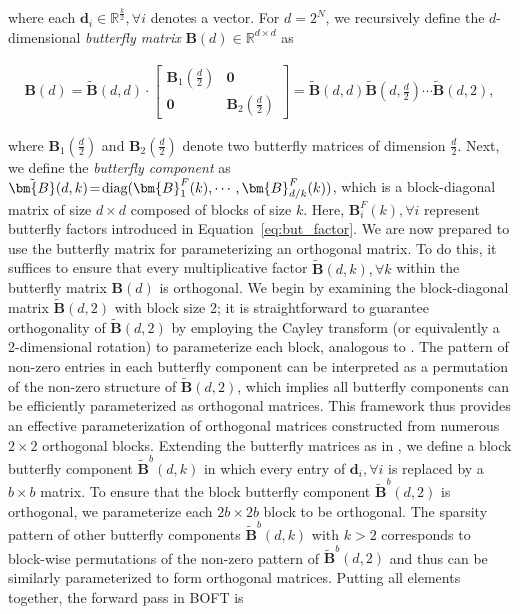 where each $\bm{d}_i\in\mathbb{R}^{\frac{k}{2}}, \forall i$ denotes a vector. For $d=2^N$, we recursively define the $d$-dimensional \emph{butterfly matrix} $\bm{B}(d)\in\mathbb{R}^{d\times d}$ as

\begin{equation}
\begin{aligned}
    \!\!\bm{B}(d)=\tilde{\bm{B}}(d,d)\!\cdot\!\begin{bmatrix}
    \bm{B}_1(\frac{d}{2})\!\!\!\!\! & \bm{0} \\
    \bm{0}\!\!\!\!\! &\bm{B}_2(\frac{d}{2})
    \end{bmatrix}= \tilde{\bm{B}}(d,d)\tilde{\bm{B}}(d,\frac{d}{2})\cdots\tilde{\bm{B}}(d,2),
\end{aligned}
\end{equation}

where $\bm{B}_1(\frac{d}{2})$ and $\bm{B}_2(\frac{d}{2})$ denote two butterfly matrices of dimension $\frac{d}{2}$. Next, we define the \emph{butterfly component} as $\thickmuskip=2mu \medmuskip=2mu \tilde{\bm{B}}(d,k)=\text{diag}(\bm{B}^F_1(k),\cdots,\bm{B}^F_{d/k}(k))$, which is a block-diagonal matrix of size $d \times d$ composed of blocks of size $k$. Here, $\bm{B}^F_i(k), \forall i$ represent butterfly factors introduced in Equation~\ref{eq:but_factor}. We are now prepared to use the butterfly matrix for parameterizing an orthogonal matrix. To do this, it suffices to ensure that every multiplicative factor $\tilde{\bm{B}}(d,k), \forall k$ within the butterfly matrix $\bm{B}(d)$ is orthogonal. We begin by examining the block-diagonal matrix $\tilde{\bm{B}}(d,2)$ with block size 2; it is straightforward to guarantee orthogonality of $\tilde{\bm{B}}(d,2)$ by employing the Cayley transform (or equivalently a 2-dimensional rotation) to parameterize each block, analogous to \cite{liu2021orthogonal,qiu2023controlling}. The pattern of non-zero entries in each butterfly component can be interpreted as a permutation of the non-zero structure of $\tilde{\bm{B}}(d,2)$, which implies all butterfly components can be efficiently parameterized as orthogonal matrices. This framework thus provides an effective parameterization of orthogonal matrices constructed from numerous $2 \times 2$ orthogonal blocks. Extending the butterfly matrices as in \cite{chen2022pixelated}, we define a block butterfly component $\tilde{\bm{B}}^b(d,k)$ in which every entry of $\bm{d}_i, \forall i$ is replaced by a $b \times b$ matrix. To ensure that the block butterfly component $\tilde{\bm{B}}^b(d,2)$ is orthogonal, we parameterize each $2b \times 2b$ block to be orthogonal. The sparsity pattern of other butterfly components $\tilde{\bm{B}}^b(d,k)$ with $k > 2$ corresponds to block-wise permutations of the non-zero pattern of $\tilde{\bm{B}}^b(d,2)$ and thus can be similarly parameterized to form orthogonal matrices. Putting all elements together, the forward pass in BOFT is

